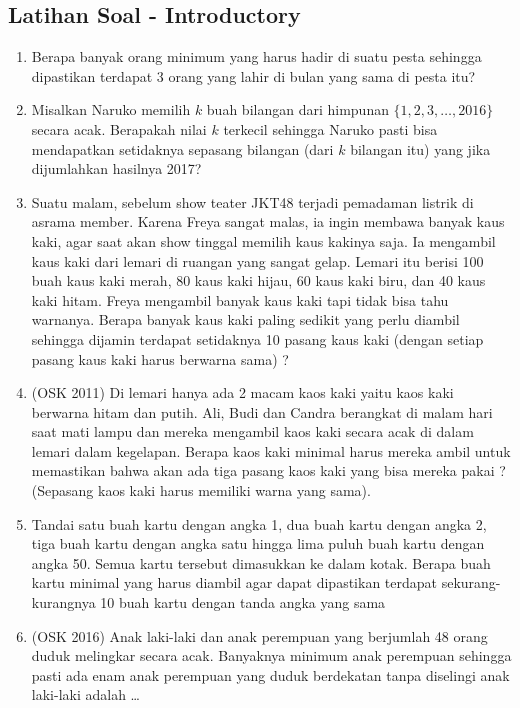 \documentclass[11pt]{scrartcl}
\begin{document}
\subsection{Latihan Soal - Introductory}
\begin{enumerate}
\item Berapa banyak orang minimum yang harus hadir di suatu pesta sehingga dipastikan terdapat 3 orang yang lahir di bulan yang sama di pesta itu?

\item Misalkan Naruko memilih $k$ buah bilangan dari himpunan $\{1,2,3,\dots,2016\}$ secara acak. Berapakah nilai $k$ terkecil sehingga Naruko pasti bisa mendapatkan setidaknya sepasang bilangan (dari $k$ bilangan itu) yang jika dijumlahkan hasilnya 2017?

\item Suatu malam, sebelum show teater JKT48 terjadi pemadaman listrik di asrama member. Karena Freya sangat malas, ia ingin membawa banyak kaus kaki, agar saat akan show tinggal memilih kaus kakinya saja. Ia mengambil kaus kaki dari lemari di ruangan yang sangat gelap. Lemari itu berisi 100 buah kaus kaki merah, 80 kaus kaki hijau, 60 kaus kaki biru, dan 40 kaus kaki hitam. Freya mengambil banyak kaus kaki tapi tidak bisa tahu warnanya. Berapa banyak kaus kaki paling sedikit yang perlu diambil sehingga dijamin terdapat setidaknya 10 pasang kaus kaki (dengan setiap pasang kaus kaki harus berwarna sama) ?

\item (OSK 2011) Di lemari hanya ada 2 macam kaos kaki yaitu kaos kaki berwarna hitam dan putih. Ali, Budi dan Candra berangkat di malam hari saat mati lampu dan mereka mengambil kaos kaki secara acak di dalam lemari dalam kegelapan. Berapa kaos kaki minimal harus mereka ambil untuk memastikan bahwa akan ada tiga pasang kaos kaki yang bisa mereka pakai ? (Sepasang kaos kaki harus memiliki warna yang sama).
    
\item Tandai satu buah kartu dengan angka 1, dua buah kartu dengan angka 2, tiga buah kartu dengan angka satu hingga lima puluh buah kartu dengan angka 50. Semua kartu tersebut dimasukkan ke dalam kotak. Berapa buah kartu minimal yang harus diambil agar dapat dipastikan terdapat sekurang-kurangnya 10 buah kartu dengan tanda angka yang sama 

\item (OSK 2016) Anak laki-laki dan anak perempuan yang berjumlah 48 orang duduk melingkar secara acak. Banyaknya minimum anak perempuan sehingga pasti ada enam anak perempuan yang duduk berdekatan tanpa diselingi anak laki-laki adalah \dots
\end{enumerate}
\end{document}
